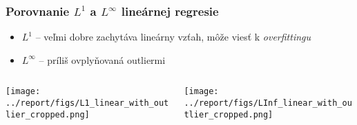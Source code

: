 \documentclass[presentation.tex]{subfiles}
\begin{document}
\begin{frame}
	\frametitle{Porovnanie $L^1$ a $L^{\infty}$ lineárnej regresie}
	
	\begin{itemize}
		\item $L^1$ -- veľmi dobre zachytáva lineárny vzťah, môže viesť k \textit{overfittingu}
		\item $L^{\infty}$ -- príliš ovplyňovaná outliermi
	\end{itemize}
	
	\begin{columns}
		\begin{column}{0.5\textwidth}
			\centering
			\texttt{[image: ../report/figs/L1\_linear\_with\_outlier\_cropped.png]}
		\end{column}
		\begin{column}{0.5\textwidth}
			\centering
			\texttt{[image: ../report/figs/LInf\_linear\_with\_outlier\_cropped.png]}
		\end{column}
	\end{columns}
	
\end{frame}
\end{document}
